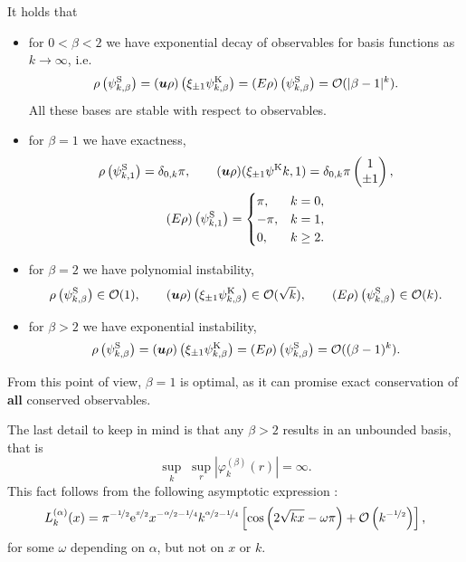 \begin{corollary} \label{cor:polobs}
It holds that
\begin{itemize}
\item for $0<\beta<2$ we have exponential decay of observables for basis functions as $k\to\infty$, i.e.
\[
    \rho\left(\psi^{\mathrm{S}}_{k,\beta}\right) = ({\bm u}\rho)\left(\xi_{\pm1}\psi^{\mathrm{K}}_{k,\beta}\right)
    = (E\rho)\left(\psi^{\mathrm{S}}_{k,\beta}\right) = \mathcal{O}(|\beta-1|^k).
\]
All these bases are stable with respect to observables.
\item for $\beta=1$ we have exactness,
\begin{gather*}
    \rho\left(\psi^{\mathrm{S}}_{k,1}\right) = \delta_{0,k}\pi, \qquad
    ({\bm u}\rho)(\xi_{\pm1}\psi^{\mathrm{K}}{k,1}) = \delta_{0,k} \pi \begin{pmatrix}1\\\pm1\end{pmatrix},\\
    (E\rho)\left(\psi^{\mathrm{S}}_{k,1}\right) = \begin{cases} \pi,&k=0,\\ -\pi,&k=1,\\ 0,&k\geq2. \end{cases}
\end{gather*}
\item for $\beta=2$ we have polynomial instability,
\[
    \rho\left(\psi^{\mathrm{S}}_{k,\beta}\right) \in \mathcal{O}(1), \qquad
    ({\bm u}\rho)\left(\xi_{\pm1}\psi^{\mathrm{K}}_{k,\beta}\right) \in \mathcal{O}(\sqrt{k}), \qquad
    (E\rho)\left(\psi^{\mathrm{S}}_{k,\beta}\right) \in \mathcal{O}(k).
\]
\item for $\beta>2$ we have exponential instability,
\[
    \rho\left(\psi^{\mathrm{S}}_{k,\beta}\right) = ({\bm u}\rho)\left(\xi_{\pm1}\psi^{\mathrm{K}}_{k,\beta}\right)
    = (E\rho)\left(\psi^{\mathrm{S}}_{k,\beta}\right) = \mathcal{O}((\beta-1)^k).
\]
\end{itemize}
\end{corollary}
From this point of view, $\beta=1$ is optimal, as it can promise exact conservation of {\bf all} conserved
observables.

The last detail to keep in mind is that any $\beta>2$ results in an unbounded basis, that is
\[
    \sup_k \; \sup_r \left|\varphi^{(\beta)}_k(r)\right| = \infty.
\]
This fact follows from the following asymptotic expression \cite[Equation 2.12]{Gavrilyuk11}:
\[
    L_k^{(\alpha)}(x) = \pi^{-\nicefrac{1}{2}} \mathrm{e}^{\nicefrac{x}{2}}
                        x^{-\nicefrac{\alpha}{2}-\nicefrac{1}{4}}
                        k^{\nicefrac{\alpha}{2}-\nicefrac{1}{4}}
                        \left[ \cos\left(2\sqrt{kx}-\omega\pi\right) + 
                               \mathcal{O}\left(k^{-\nicefrac{1}{2}}\right)
                        \right],
\]
for some $\omega$ depending on $\alpha$, but not on $x$ or $k$.

